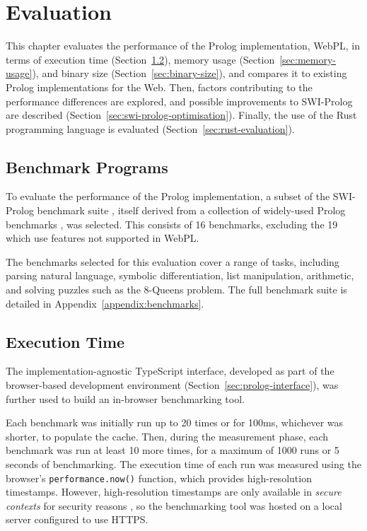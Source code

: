 
\chapter{Evaluation}

This chapter evaluates the performance of the Prolog implementation, WebPL, in terms of execution time (Section~\ref{sec:execution-time}), memory usage (Section~\ref{sec:memory-usage}), and binary size (Section~\ref{sec:binary-size}), and compares it to existing Prolog implementations for the Web. Then, factors contributing to the performance differences are explored, and possible improvements to SWI-Prolog are described (Section~\ref{sec:swi-prolog-optimisation}). Finally, the use of the Rust programming language is evaluated (Section~\ref{sec:rust-evaluation}).

\section{Benchmark Programs}

To evaluate the performance of the Prolog implementation, a subset of the SWI-Prolog benchmark suite \cite{wielemakerSWIPrologbenchmarksuite2010}, itself derived from a collection of widely-used Prolog benchmarks \cite{haygoodPrologBenchmarkSuite1989}, was selected. This consists of 16 benchmarks, excluding the 19 which use features not supported in WebPL.

The benchmarks selected for this evaluation cover a range of tasks, including parsing natural language, symbolic differentiation, list manipulation, arithmetic, and solving puzzles such as the 8-Queens problem. The full benchmark suite is detailed in Appendix~\ref{appendix:benchmarks}.

\section{Execution Time}

\label{sec:execution-time}

The implementation-agnostic TypeScript interface, developed as part of the browser-based development environment (Section~\ref{sec:prolog-interface}), was further used to build an in-browser benchmarking tool.

Each benchmark was initially run up to 20 times or for 100ms, whichever was shorter, to populate the cache. Then, during the measurement phase, each benchmark was run at least 10 more times, for a maximum of 1000 runs or 5 seconds of benchmarking. The execution time of each run was measured using the browser's \texttt{performance.now()} function, which provides high-resolution timestamps. However, high-resolution timestamps are only available in \emph{secure contexts} for security reasons \cite{sanchez-rolaClockClockTimeBased2018}, so the benchmarking tool was hosted on a local server configured to use HTTPS.

